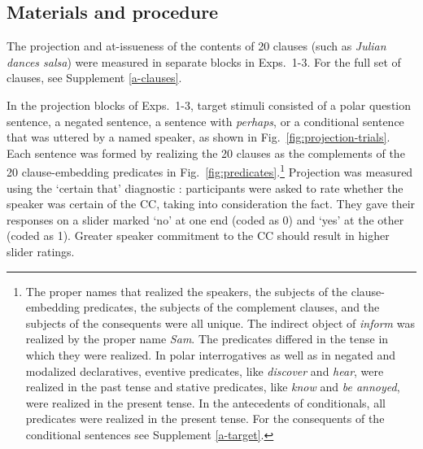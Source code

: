 \documentclass[11pt,fleqn]{article}
\newcommand{\6}{\mbox{$[\hspace*{-.6mm}[$}}
\newcommand{\9}{\mbox{$]\hspace*{-.6mm}]$}}
\begin{document}
\subsection{Materials and procedure}

The projection and at-issueness of the contents of 20 clauses (such as {\em Julian dances salsa}) were measured in separate blocks in Exps.~1-3. For the full set of clauses, see Supplement \ref{a-clauses}. 

In the projection blocks of Exps.~1-3, target stimuli consisted of a polar question sentence, a negated sentence, a sentence with {\em perhaps}, or a conditional sentence that was uttered by a named speaker, as shown in Fig.~\ref{fig:projection-trials}. Each sentence was formed by realizing the 20 clauses as the complements of the 20 clause-embedding predicates in Fig.~\ref{fig:predicates}.\footnote{The proper names that realized the speakers, the subjects of the clause-embedding predicates, the subjects of the complement clauses, and the subjects of the consequents  were all unique. The indirect object of {\em inform} was realized by the proper name {\em Sam}. The predicates differed in the tense in which they were realized. In polar interrogatives as well as in negated and modalized declaratives, eventive predicates, like {\em discover} and {\em hear}, were realized in the past tense and stative predicates, like {\em know} and {\em be annoyed}, were realized in the present tense.  In the antecedents of conditionals, all predicates were realized in the present tense. For the consequents of the conditional sentences see Supplement \ref{a-target}.} Projection was measured using the `certain that' diagnostic \cite{djaerv-bacovcin-salt27,tbd-variability, lorson2018, mahler2020}: participants were asked to rate whether the speaker was certain of the CC, taking into consideration the fact. They gave their responses on a slider marked `no' at one end (coded as 0) and `yes' at the other (coded as 1). Greater speaker commitment to the CC should result in higher slider ratings.

\end{document}
